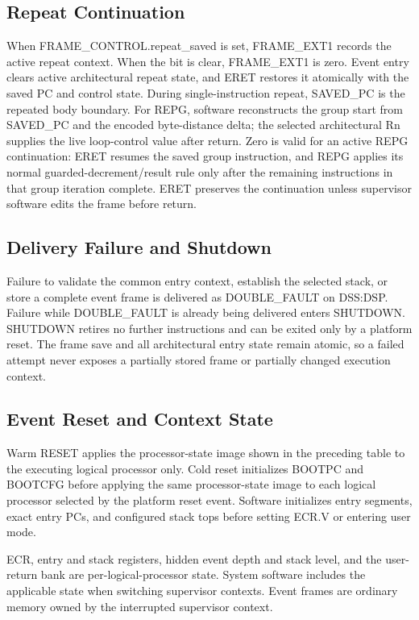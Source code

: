 \subsection{Repeat Continuation}
\begin{samepage}
When FRAME\_CONTROL.repeat\_saved is set, FRAME\_EXT1 records the active repeat context. When the bit is clear,
FRAME\_EXT1 is zero. Event entry clears active
architectural repeat state, and ERET restores it atomically with the saved PC and control state. During
single-instruction repeat, SAVED\_PC is the repeated body boundary. For REPG, software reconstructs the group start
from SAVED\_PC and the encoded byte-distance delta; the selected architectural Rn supplies the live loop-control
value after return. Zero is valid for an active REPG continuation: ERET resumes the saved group instruction, and
REPG applies its normal guarded-decrement/result rule only after the remaining instructions in that group
iteration complete. ERET preserves the continuation unless supervisor software edits the frame before return.




\end{samepage}

\subsection{Delivery Failure and Shutdown}
Failure to validate the common entry context, establish the selected stack, or store a complete event frame is
delivered as DOUBLE\_FAULT on DSS:DSP. Failure while DOUBLE\_FAULT is already being delivered enters SHUTDOWN.
SHUTDOWN retires no further instructions and can be exited only by a platform reset.
The frame save and all architectural entry state remain atomic, so a failed attempt never exposes a partially stored
frame or partially changed execution context.

\Needspace{4.0in}
\subsection{Event Reset and Context State}


\Needspace{1.8in}
Warm RESET applies the processor-state image shown in the preceding table to the executing logical processor only. Cold
reset initializes BOOTPC and BOOTCFG before applying the same processor-state image to each logical processor selected
by the platform reset event. Software initializes entry segments, exact entry PCs, and configured stack tops before setting ECR.V
or entering user mode.

ECR, entry and stack registers, hidden event depth and stack level, and the user-return bank are per-logical-processor
state. System software includes the applicable state when switching supervisor contexts. Event frames are ordinary
memory owned by the interrupted supervisor context.
